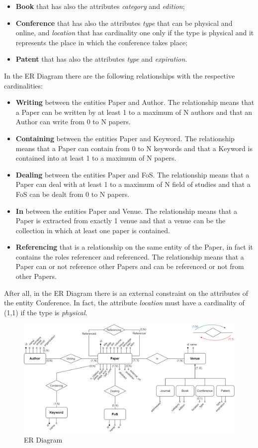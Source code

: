 \documentclass{Configuration_Files/PoliMi3i_thesis}
\begin{document}
\begin{itemize}
\begin{itemize}
            \item \textbf{Book} that has also the attributes \textit{category} and \textit{edition};
            \item \textbf{Conference} that has also the attributes \textit{type} that can be physical and online, and \textit{location} that has cardinality one only if the type is physical and it represents the place in which the conference takes place;
            \item \textbf{Patent} that has also the attributes \textit{type} and \textit{expiration}.
        \end{itemize}
\end{itemize}

In the ER Diagram there are the following relationships with the respective cardinalities:
\begin{itemize}
    \item \textbf{Writing} between the entities Paper and Author. The relationship means that a Paper can be written by at least 1 to a maximum of N authors and that an Author can write from 0 to N papers. 
    \item \textbf{Containing} between the entities Paper and Keyword. The relationship means that a Paper can contain from 0 to N keywords and that a Keyword is contained into at least 1 to a maximum of N papers.
    \item \textbf{Dealing} between the entities Paper and FoS. The relationship means that a Paper can deal with at least 1 to a maximum of N field of studies and that a FoS can be dealt from 0 to N papers. 
    \item \textbf{In} between the entities Paper and Venue. The relationship means that a Paper is extracted from exactly 1 venue and that a venue can be the collection in which at least one paper is contained.
    \item \textbf{Referencing} that is a relationship on the same entity of the Paper, in fact it contains the roles referencer and referenced. The relationship means that a Paper can or not reference other Papers and can be referenced or not from other Papers.
\end{itemize}
After all, in the ER Diagram there is an external constraint on the attributes of the entity Conference. In fact, the attribute \textit{location} must have a cardinality of (1,1) if the type is \textit{physical}. 
\begin{figure}[H]
    \centering
    \includegraphics[width=1\textwidth]{Images/er_diagram.png}
    \caption{ER Diagram}
    \label{fig:quadtree}
\end{figure}
\end{document}
